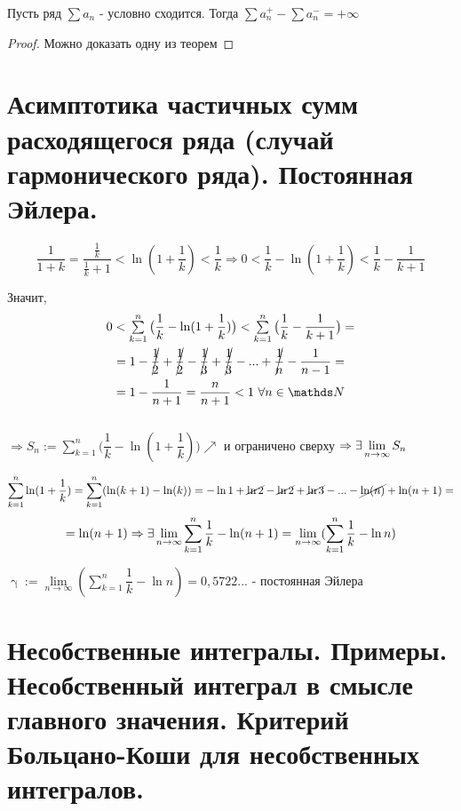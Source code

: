 \documentclass[11pt, fleqn]{article}
\begin{document}
\begin{Property}[3]
\begin{Property}[4]
\begin{Property}[2, аддитивность]
\begin{theorem} [Римана v2]
    Пусть ряд $\sum a_n$ - условно сходится. Тогда $\sum a_n^+ - \sum a_n^- = + \infty$
\end{theorem}

\begin{proof}
    Можно доказать одну из теорем
\end{proof}

\newpage
\section{Асимптотика частичных сумм расходящегося ряда (случай гармонического ряда). Постоянная Эйлера.}
 
\[\frac{1}{1+k} = \frac{\frac{1}{k}}{\frac{1}{k}+1} < \ln(1+\frac{1}{k}) < \frac{1}{k} \Rightarrow 0 < \frac{1}{k} - \ln(1+\frac{1}{k})< \frac{1}{k}-\frac{1}{k+1}\]

Значит, \begin{multline*}
    $$0 < \sum\limits_{k=1}^n \big(\dfrac{1}{k} - \ln(1+\dfrac{1}{k})\big) < \sum\limits_{k=1}^n \big(\dfrac{1}{k} - \dfrac{1}{k+1}\big) = \\
    =1 - \cancel{\frac{1}{2}} + \cancel{\frac{1}{2}} - \cancel{\frac{1}{3}} + \cancel{\frac{1}{3}} -...+ \cancel{\frac{1}{n}} - \frac{1}{n-1} =\\
    =1 - \frac{1}{n+1} = \frac{n}{n+1} < 1\ \forall n \in \N$$
\end{multline*}
\\
$\Rightarrow S_n := \sum\limits_{k=1}^n \big(\dfrac{1}{k} - \ln(1+\dfrac{1}{k})\big) \nearrow$ и ограничено сверху $\Rightarrow \exists \lim\limits_{n \rightarrow \infty} S_n$

$$\sum\limits_{k=1}^n \ln (1+ \frac{1}{k}) = \sum\limits_{k=1}^n (\ln(k+1) - \ln(k)) = -\ln1+\cancel{\ln2}-\cancel{\ln2}+\cancel{\ln3}-...-\cancel{\ln (n)}+ \ln (n+1) =$$
$$ =\ln (n+1) \Rightarrow \exists \lim\limits_{n \rightarrow \infty} \sum\limits_{k=1}^n \frac{1}{k} - \ln (n+1) = \lim\limits_{n \rightarrow \infty} (\sum\limits_{k=1}^n \frac{1}{k} - \ln n)$$

\begin{definition}
    $\upgamma := \lim\limits_{n \rightarrow \infty} (\sum\limits_{k=1}^n \dfrac{1}{k} - \ln n) = 0,5722...$ - постоянная Эйлера
\end{definition}

\newpage
\section{Несобственные интегралы. Примеры. Несобственный интеграл в смысле главного значения. Критерий Больцано-Коши для несобственных интегралов.}


\end{Property}
\end{Property}
\end{Property}
\end{document}

